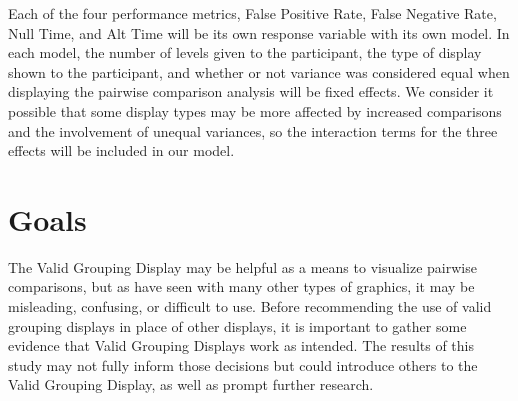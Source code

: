 \documentclass{article}
\begin{document}
Each of the four performance metrics, False Positive Rate, False Negative Rate, Null Time, and Alt Time will be its own response variable with its own model. In each model, the number of levels given to the participant, the type of display shown to the participant, and whether or not variance was considered equal when displaying the pairwise comparison analysis will be fixed effects. We consider it possible that some display types may be more affected by increased comparisons and the involvement of unequal variances, so the interaction terms for the three effects will be included in our model. 

\section{Goals}

The Valid Grouping Display may be helpful as a means to visualize pairwise comparisons, but as have seen with many other types of graphics, it may be misleading, confusing, or difficult to use. Before recommending the use of valid grouping displays in place of other displays, it is important to gather some evidence that Valid Grouping Displays work as intended. The results of this study may not fully inform those decisions but could introduce others to the Valid Grouping Display, as well as prompt further research.





\end{document}
